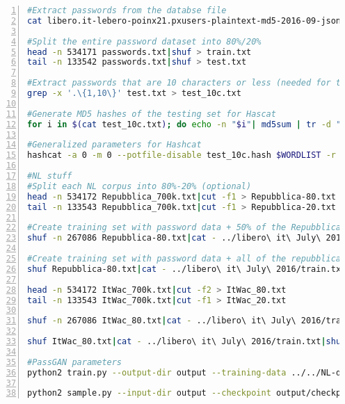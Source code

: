 \begin{lstlisting}[language=bash,numbers=left,stepnumber=1,breaklines=true,postbreak=\mbox{\textcolor{red}{$\hookrightarrow$}\space}]
#Extract passwords from the databse file
cat libero.it-lebero-poinx21.pxusers-plaintext-md5-2016-09-json-900k-users-extremely-private.txt|grep clearPassword |cut -d ":" -f 2 | awk '{gsub ("\"","");gsub(",","");print $1}' > passwords.txt

#Split the entire password dataset into 80%/20%
head -n 534171 passwords.txt|shuf > train.txt
tail -n 133542 passwords.txt|shuf > test.txt

#Extract passwords that are 10 characters or less (needed for testing)
grep -x '.\{1,10\}' test.txt > test_10c.txt

#Generate MD5 hashes of the testing set for Hascat
for i in $(cat test_10c.txt); do echo -n "$i"| md5sum | tr -d " -" >> test_10c.hash; done

#Generalized parameters for Hashcat
hashcat -a 0 -m 0 --potfile-disable test_10c.hash $WORDLIST -r $RULESET -o out.txt

#NL stuff
#Split each NL corpus into 80%-20% (optional)
head -n 534172 Repubblica_700k.txt|cut -f1 > Repubblica-80.txt
tail -n 133543 Repubblica_700k.txt|cut -f1 > Repubblica-20.txt

#Create training set with password data + 50% of the Repubblica dataset
shuf -n 267086 Repubblica-80.txt|cat - ../libero\ it\ July\ 2016/train.txt|shuf > libero+Repubblica-50.txt

#Create training set with password data + all of the repubblica data
shuf Repubblica-80.txt|cat - ../libero\ it\ July\ 2016/train.txt|shuf > libero+Repubblica.txt

head -n 534172 ItWac_700k.txt|cut -f2 > ItWac_80.txt
tail -n 133543 ItWac_700k.txt|cut -f1 > ItWac_20.txt

shuf -n 267086 ItWac_80.txt|cat - ../libero\ it\ July\ 2016/train.txt|shuf > libero+ItWac-50.txt

shuf ItWac_80.txt|cat - ../libero\ it\ July\ 2016/train.txt|shuf > libero+ItWac.txt

#PassGAN parameters
python2 train.py --output-dir output --training-data ../../NL-dict/ItWac/libero+ItWac-50.txt

python2 sample.py --input-dir output --checkpoint output/checkpoints/checkpoint_95000.ckpt --output ~/Desktop/Hashcat_tests/passgan_itwac_50.txt -n 14344392 
\end{lstlisting}

